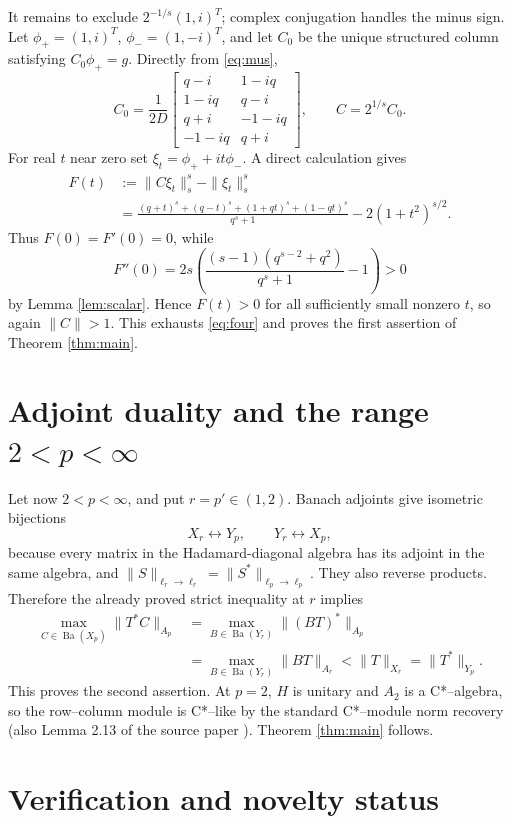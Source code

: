 \documentclass[11pt]{article}
\newcommand{\Ba}{\operatorname{Ba}}
\begin{document}
It remains to exclude \(2^{-1/s}(1,i)^T\); complex conjugation handles the
minus sign.  Let \(\phi_+=(1,i)^T\), \(\phi_-=(1,-i)^T\), and let \(C_0\) be
the unique structured column satisfying \(C_0\phi_+=g\).  Directly from
\eqref{eq:mus},
\[
 C_0=\frac1{2D}\begin{bmatrix}
 q-i&1-iq\\1-iq&q-i\\
 q+i&-1-iq\\-1-iq&q+i
 \end{bmatrix},
 \qquad C=2^{1/s}C_0.
\]
For real \(t\) near zero set \(\xi_t=\phi_++it\phi_-\).  A direct calculation
gives
\begin{align*}
 F(t)&:=\|C\xi_t\|_s^s-\|\xi_t\|_s^s\\
 &=\frac{(q+t)^s+(q-t)^s+(1+qt)^s+(1-qt)^s}{q^s+1}
   -2(1+t^2)^{s/2}.
\end{align*}
Thus \(F(0)=F'(0)=0\), while
\[
 F''(0)=2s\left(\frac{(s-1)(q^{s-2}+q^2)}{q^s+1}-1\right)>0
\]
by Lemma \ref{lem:scalar}.  Hence \(F(t)>0\) for all sufficiently small
nonzero \(t\), so again \(\|C\|>1\).  This exhausts \eqref{eq:four} and proves
the first assertion of Theorem \ref{thm:main}.

\section{Adjoint duality and the range \(2<p<\infty\)}

Let now \(2<p<\infty\), and put \(r=p'\in(1,2)\).  Banach adjoints give
isometric bijections
\[
 X_r\longleftrightarrow Y_p,\qquad Y_r\longleftrightarrow X_p,
\]
because every matrix in the Hadamard-diagonal algebra has its adjoint in the
same algebra, and \(\|S\|_{\ell_r\to\ell_r}=\|S^*\|_{\ell_p\to\ell_p}\).
They also reverse products.  Therefore the already proved strict inequality at
\(r\) implies
\begin{align*}
 \max_{C\in\Ba(X_p)}\|T^*C\|_{A_p}
 &=\max_{B\in\Ba(Y_r)}\|(BT)^*\|_{A_p}\\
 &=\max_{B\in\Ba(Y_r)}\|BT\|_{A_r}
 <\|T\|_{X_r}=\|T^*\|_{Y_p}.
\end{align*}
This proves the second assertion.  At \(p=2\), \(H\) is unitary and \(A_2\)
is a C*--algebra, so the row--column module is C*--like by the standard
C*--module norm recovery (also Lemma 2.13 of the source paper
\cite{source}).  Theorem \ref{thm:main} follows.

\section{Verification and novelty status}
\end{document}
